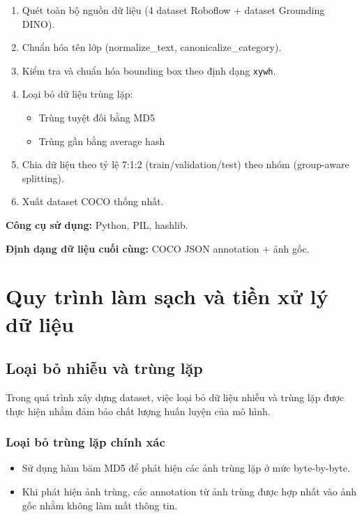 \begin{enumerate}
    \item Quét toàn bộ nguồn dữ liệu (4 dataset Roboflow + dataset Grounding DINO).
    \item Chuẩn hóa tên lớp (normalize\_text, canonicalize\_category).
    \item Kiểm tra và chuẩn hóa bounding box theo định dạng \texttt{xywh}.
    \item Loại bỏ dữ liệu trùng lặp:
    \begin{itemize}
        \item Trùng tuyệt đối bằng MD5
        \item Trùng gần bằng average hash
    \end{itemize}
    \item Chia dữ liệu theo tỷ lệ 7:1:2 (train/validation/test) theo nhóm (group-aware splitting).
    \item Xuất dataset COCO thống nhất.
\end{enumerate}

\textbf{Công cụ sử dụng:}
Python, PIL, hashlib.

\textbf{Định dạng dữ liệu cuối cùng:}
COCO JSON annotation + ảnh gốc.

\section{Quy trình làm sạch và tiền xử lý dữ liệu}

\subsection{Loại bỏ nhiễu và trùng lặp}

Trong quá trình xây dựng dataset, việc loại bỏ dữ liệu nhiễu và trùng lặp được thực hiện nhằm đảm bảo chất lượng huấn luyện của mô hình.

\subsubsection{Loại bỏ trùng lặp chính xác}

\begin{itemize}
    \item Sử dụng hàm băm MD5 để phát hiện các ảnh trùng lặp ở mức byte-by-byte.
    \item Khi phát hiện ảnh trùng, các annotation từ ảnh trùng được hợp nhất vào ảnh gốc nhằm không làm mất thông tin.
\end{itemize}

